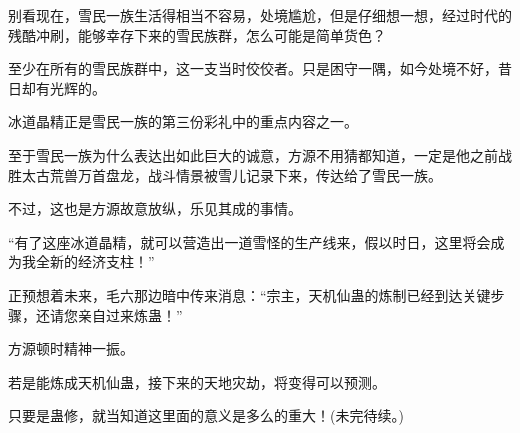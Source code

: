 \begin{this_body}
别看现在，雪民一族生活得相当不容易，处境尴尬，但是仔细想一想，经过时代的残酷冲刷，能够幸存下来的雪民族群，怎么可能是简单货色？

至少在所有的雪民族群中，这一支当时佼佼者。只是困守一隅，如今处境不好，昔日却有光辉的。

冰道晶精正是雪民一族的第三份彩礼中的重点内容之一。

至于雪民一族为什么表达出如此巨大的诚意，方源不用猜都知道，一定是他之前战胜太古荒兽万首盘龙，战斗情景被雪儿记录下来，传达给了雪民一族。

不过，这也是方源故意放纵，乐见其成的事情。

“有了这座冰道晶精，就可以营造出一道雪怪的生产线来，假以时日，这里将会成为我全新的经济支柱！”

正预想着未来，毛六那边暗中传来消息：“宗主，天机仙蛊的炼制已经到达关键步骤，还请您亲自过来炼蛊！”

方源顿时精神一振。

若是能炼成天机仙蛊，接下来的天地灾劫，将变得可以预测。

只要是蛊修，就当知道这里面的意义是多么的重大！(未完待续。)

\end{this_body}

